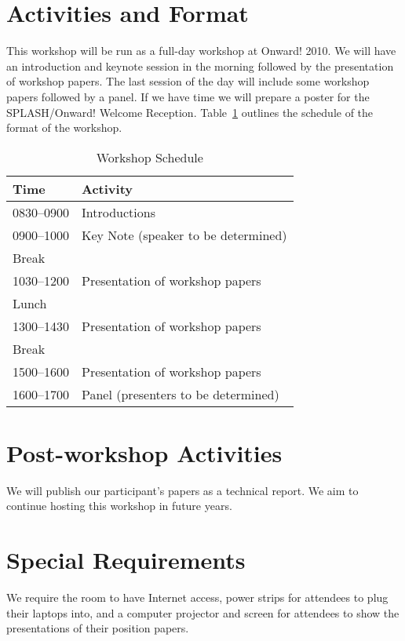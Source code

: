 \documentclass[authorpermission]{sigplanconf}
\begin{document}
\section{Activities and Format}

This workshop will be run as a full-day workshop at Onward! 2010.  We
will have an introduction and keynote session in the morning followed
by the presentation of workshop papers.  The last session of the day
will include some workshop papers followed by a panel. 
If we have time we will prepare a poster for the
SPLASH/Onward! Welcome Reception.  Table~\ref{tab:schedule} outlines the
schedule of the format of the workshop.


\begin{table} [!htbp] %
\begin{tabularx}{\columnwidth}{l|X}
\textbf{Time}   & \textbf{Activity} \\
\hline
0830--0900    & Introductions \vspace{1mm} \\
0900--1000    & Key Note (speaker to be determined) \vspace{1mm} \\
Break              & ~\vspace{1mm}\\
1030--1200   & Presentation of workshop papers \vspace{1mm}\\
Lunch             & ~\vspace{1mm}\\
1300--1430   & Presentation of workshop papers \vspace{1mm}\\
Break              & ~\vspace{1mm}\\
1500--1600    & Presentation of workshop papers \vspace{1mm}\\
1600--1700    & Panel (presenters to be determined) \\

\end{tabularx}
\caption{Workshop Schedule}
\label{tab:schedule}
\end{table}

\section{Post-workshop Activities}

We will publish our participant's papers as a technical report.
We aim to continue hosting this workshop in future years.

\section{Special Requirements}

We require the room to have Internet access, power strips for
attendees to plug their laptops into, and a computer projector and
screen for attendees to show the presentations of their position
papers.
\end{document}

